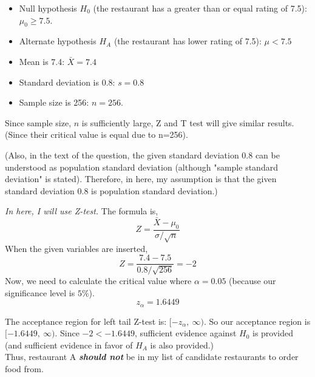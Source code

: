 \begin{itemize}[leftmargin=.6cm]
  \item Null hypothesis $H_0$ (the restaurant has a greater than or equal rating of 7.5): $\mu_0 \geq 7.5$.
  \item Alternate hypothesis $H_A$ (the restaurant has lower rating of 7.5): $\mu < 7.5$
  \item Mean is 7.4: $\bar{X} = 7.4$ 
  \item Standard deviation is 0.8: $s = 0.8$
  \item Sample size is 256: $n = 256$.
\end{itemize}

\begin{tcolorbox}[colback=ex!50]
Since sample size, $n$ is sufficiently large, Z and T test will give similar results. (Since their critical value is equal due to n=256).

(Also, in the text of the question, the given standard deviation 0.8 can be understood as population standard deviation (although "sample standard deviation" is stated). Therefore, in here, my assumption is that the given standard deviation 0.8 is population standard deviation.)

\end{tcolorbox}

\noindent \textit{In here, I will use Z-test.} The formula is,
\begin{equation*}
  Z = \frac{\bar{X} - \mu_0}{\sigma / \sqrt{n}}
\end{equation*}
When the given variables are inserted,
\begin{equation*}
  Z = \frac{7.4 - 7.5}{0.8 / \sqrt{256}} = -2
\end{equation*}
Now, we need to calculate the critical value where $\alpha = 0.05$ (because our significance level is $5\%$).
\begin{equation*}
  z_{\alpha} = 1.6449
\end{equation*}

\noindent The acceptance region for left tail Z-test is: $[-z_{\alpha},\ \infty)$. So our acceptance region is $[-1.6449,\ \infty)$. Since $-2 < -1.6449$, sufficient evidence against $H_0$ is provided (and sufficient evidence in favor of $H_A$ is also provided.)\\

Thus, restaurant A \textbf{\textit{should not}} be in my list of candidate restaurants to order food from.
